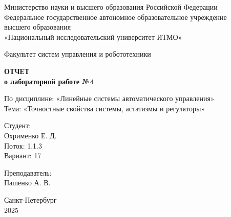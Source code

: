 \documentclass[a4paper,12pt]{article}
\begin{document}
	
	\begin{titlepage}
		\centering
		\vspace*{1cm}
		
		{\small
			Министерство науки и высшего образования Российской Федерации\\
			Федеральное государственное автономное образовательное учреждение\\
			высшего образования\\
			«Национальный исследовательский университет ИТМО»\\
		}
		
		\vspace{2cm}
		
		{\large
			Факультет систем управления и робототехники\\
		}
		
		\vspace{3cm}
		
		{\Huge\bfseries
			ОТЧЕТ\\
		}
		\vspace{0.5cm}
		{\LARGE\bfseries
			о лабораторной работе №4\\
		}
		
		\vspace{1cm}
		
		{\Large
			По дисциплине: «Линейные системы автоматического управления»\\
			\vspace{0.5cm}
			Тема: «Точностные свойства системы, астатизмы и регуляторы»\\
		}
		
		\vspace{3cm}
		
		\begin{minipage}{0.4\textwidth}
			\raggedright
			{\large
				Студент:\\
			}
			Охрименко Е. Д.\\
			Поток: 1.1.3\\
			Вариант: 17\\
		\end{minipage}
		\hfill
		\begin{minipage}{0.4\textwidth}
			\raggedleft
			{\large
				Преподаватель:\\
			}
			Пашенко А. В.\\
		\end{minipage}
		
		\vfill
		
		{\large
			Санкт-Петербург\\
			2025\\
		}
		
	\end{titlepage}
	
\end{document}
